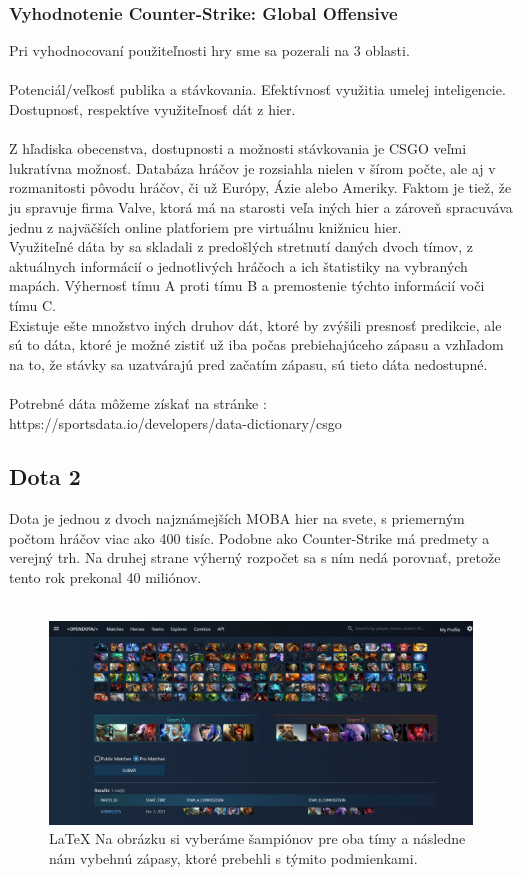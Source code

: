  \subsubsection{Vyhodnotenie Counter-Strike: Global Offensive}
 Pri vyhodnocovaní použiteľnosti hry sme sa pozerali na 3 oblasti. \\ \\ Potenciál/veľkosť publika a stávkovania. Efektívnosť využitia umelej inteligencie. Dostupnosť, respektíve využiteľnosť dát z hier. \\ \\
 Z hľadiska obecenstva, dostupnosti a možnosti stávkovania je CSGO veľmi lukratívna možnosť. Databáza hráčov je rozsiahla nielen v šírom počte, ale aj v rozmanitosti pôvodu hráčov, či už Európy, Ázie alebo Ameriky. Faktom je tiež, že ju spravuje firma Valve, ktorá má na starosti veľa iných hier a zároveň spracuváva jednu z najväčších online platforiem pre virtuálnu knižnicu hier. \\
 Využiteľné dáta by sa skladali z predošlých stretnutí daných dvoch tímov, z aktuálnych informácií o jednotlivých hráčoch a ich štatistiky na vybraných mapách. Výhernosť tímu A proti tímu B a premostenie týchto informácií voči tímu C.\\
 Existuje ešte množstvo iných druhov dát, ktoré by zvýšili presnosť predikcie, ale sú to dáta, ktoré je možné zistiť už iba počas prebiehajúceho zápasu a vzhľadom na to, že stávky sa uzatvárajú pred začatím zápasu, sú tieto dáta nedostupné.
 \\ \\
 Potrebné dáta môžeme získať na stránke :
 \\
 https://sportsdata.io/developers/data-dictionary/csgo


\subsection{Dota 2}
Dota je jednou z dvoch najznámejších MOBA hier na svete, s priemerným počtom hráčov viac ako 400 tisíc. \cite{dotaplayers} Podobne ako Counter-Strike má predmety a verejný trh. Na druhej strane výherný rozpočet sa s ním nedá porovnať, pretože tento rok prekonal 40 miliónov. \cite{dotaprizepool}
\\ \\
 \begin{figure}[h!]
	\includegraphics[width=.9\textwidth]{figures/dota1}
	\centering
	\caption{\LaTeX{} Na obrázku si vyberáme šampiónov pre oba tímy a následne nám vybehnú zápasy, ktoré prebehli s týmito podmienkami. \label{dota1}}
	
\end{figure}


